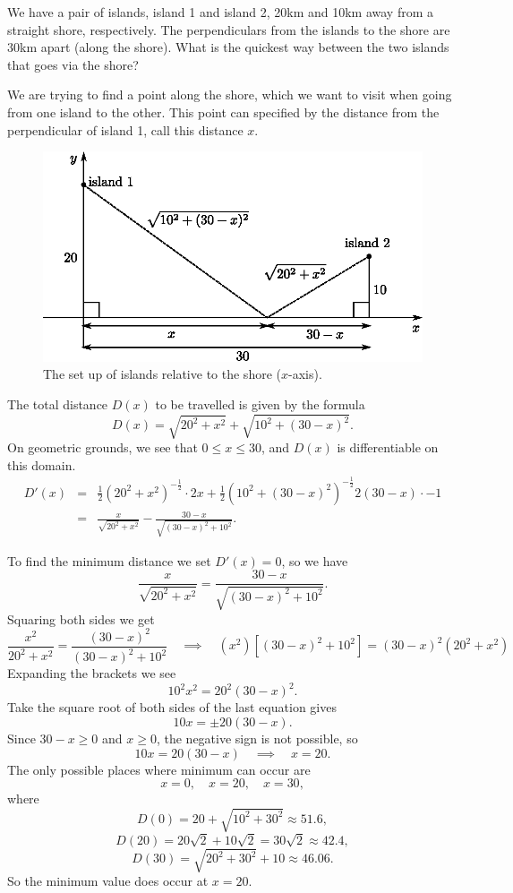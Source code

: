 \begin{example}
We have a pair of islands, island 1 and island 2, 20km and 10km away from a straight shore, respectively. The perpendiculars from the islands to the shore are 30km apart (along the shore). What is the quickest way between the two islands that goes via the shore?

We are trying to find a point along the shore, which we want to visit when going from one island to the other. This point can specified by the distance from the perpendicular of island 1, call this distance $x$.

\begin{figure}[H]
\centering
\includegraphics[scale=0.7]{img/island-set-up}
\caption{The set up of islands relative to the shore ($x$-axis).}
\label{fig:island-set-up}
\end{figure}

The total distance $D(x)$ to be travelled is given by the formula
\[D(x)=\sqrt{20^2+x^2}+\sqrt{10^2+(30-x)^2}.\]
On geometric grounds, we see that $0\le x \le 30$, and $D(x)$ is differentiable on this domain.
\begin{eqnarray*}
D'(x)&=&\frac{1}{2}(20^2+x^2)^{-\frac{1}{2}}\cdot2x+\frac{1}{2}\left(10^2+(30-x)^2\right)^{-\frac{1}{2}}2(30-x)\cdot-1\\
&=&\frac{x}{\sqrt{20^2+x^2}}-\frac{30-x}{\sqrt{(30-x)^2+10^2}}.
\end{eqnarray*}

To find the minimum distance we set $D'(x)=0$, so we have
\[\frac{x}{\sqrt{20^2+x^2}}=\frac{30-x}{\sqrt{(30-x)^2+10^2}}.\]
Squaring both sides we get
\[\frac{x^2}{20^2+x^2}=\frac{(30-x)^2}{(30-x)^2+10^2}\quad \implies \quad (x^2)[(30-x)^2+10^2]={(30-x)^2}(20^2+x^2) \]
Expanding the brackets we see
\[10^2x^2=20^2(30-x)^2.\]
Take the square root of both sides of the last equation gives
\[10x=\pm20(30-x).\]
Since $30-x\ge 0$ and $x\ge0$, the negative sign is not possible, so
\[10x=20(30-x)\quad \implies \quad x=20.\]
The only possible places where minimum can occur are
\[x=0,\quad x=20,\quad x=30,\]
where
\[D(0)=20+\sqrt{10^2+30^2}\approx 51.6,\]
\[D(20)=20\sqrt{2}+10\sqrt{2}=30\sqrt{2}\approx 42.4,\]
\[D(30)=\sqrt{20^2+30^2}+10\approx46.06.\]
So the minimum value does occur at $x=20$.


\end{example}
